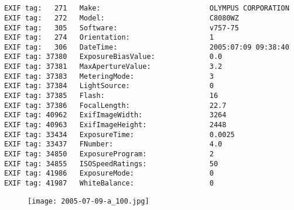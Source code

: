 \section{\protect{}}
\noindent 
\noindent
\begin{lstlisting}
EXIF tag:   271   Make:                          OLYMPUS CORPORATION
EXIF tag:   272   Model:                         C8080WZ
EXIF tag:   305   Software:                      v757-75
EXIF tag:   274   Orientation:                   1
EXIF tag:   306   DateTime:                      2005:07:09 09:38:40
EXIF tag: 37380   ExposureBiasValue:             0.0
EXIF tag: 37381   MaxApertureValue:              3.2
EXIF tag: 37383   MeteringMode:                  3
EXIF tag: 37384   LightSource:                   0
EXIF tag: 37385   Flash:                         16
EXIF tag: 37386   FocalLength:                   22.7
EXIF tag: 40962   ExifImageWidth:                3264
EXIF tag: 40963   ExifImageHeight:               2448
EXIF tag: 33434   ExposureTime:                  0.0025
EXIF tag: 33437   FNumber:                       4.0
EXIF tag: 34850   ExposureProgram:               2
EXIF tag: 34855   ISOSpeedRatings:               50
EXIF tag: 41986   ExposureMode:                  0
EXIF tag: 41987   WhiteBalance:                  0

\end{lstlisting}
\clearpage
\begin{figure}
\raggedleft
\texttt{[image: 2005-07-09-a\_100.jpg]}
\end{figure}


\clearpage
